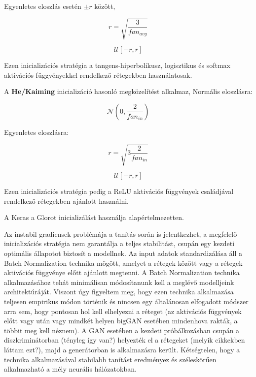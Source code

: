 Egyenletes eloszlás esetén $\pm r$ között,

$$r = \sqrt{\frac{3}{fan_{avg}}}$$

$$ \mathcal{U}\left[-r, r\right] $$

Ezen inicializációs stratégia a tangens-hiperbolikusz, logisztikus és softmax aktivációs függvényekkel rendelkező rétegekben használatosak. 

A \textbf{He/Kaiming} inicializáció hasonló megközelítést alkalmaz,
Normális eloszlásra:

$$ \mathcal{N}(0, \frac{2}{fan_{in}}) $$

Egyenletes eloszlásra:

$$r = \sqrt{3\frac{2}{fan_{in}}}$$

$$ \mathcal{U}\left[-r, r\right] $$

Ezen inicializációs stratégia pedig a ReLU aktivációs függvények családjával rendelkező rétegekben ajánlott használni.

A Keras a Glorot inicializálást használja alapértelmezetten.

Az instabil gradiensek problémája a tanítás során is jelentkezhet, a megfelelő inicializációs stratégia nem garantálja a teljes stabilitást, csupán egy kezdeti optimális állapotot biztosít a modellnek.
Az input adatok standardizálása áll a Batch Normalization technika mögött, amelyet a rétegek között vagy a rétegek aktivációs függvénye előtt ajánlott megtenni. A Batch Normalization technika alkalmazásához tehát minimálisan módosítanunk kell a meglévő modelljeink architektúráját. Viszont úgy figyeltem meg, hogy ezen technika alkalmazása teljesen empirikus módon történik és nincsen egy általánosan elfogadott módszer arra sem, hogy pontosan hol kell elhelyezni a réteget (az aktivációs függvények előtt vagy után vagy mindkét helyen bigGAN esetében mindenhova rakták, a többit meg kell néznem). A GAN esetében a kezdeti próbálkozásban csupán a diszkriminátorban (tényleg így van?) helyezték el a rétegeket (melyik cikkekben láttam ezt?), majd a generátorban is alkalmazásra került. Kétségtelen, hogy a technika alkalmazásával stabilabb tanítást eredményez és széleskörűen alkalmazható a mély neurális hálózatokban.

